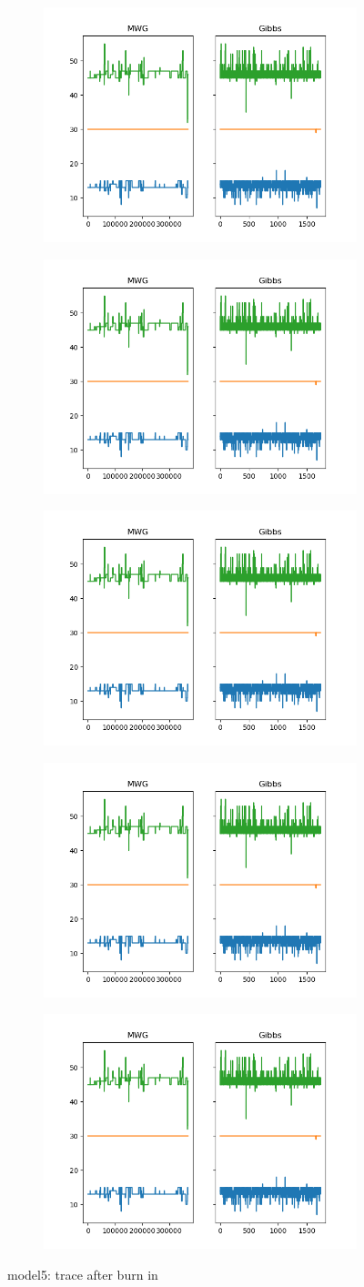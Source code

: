 \begin{figure}[h]
    \centering
    \begin{subfigure}
    	\centering
        \includegraphics[width=0.3\linewidth]{../../plots/Trace_post_burnin_M4_N60_NMCMC3_seed0_diffind2.png}
    \end{subfigure}
    \begin{subfigure}
        \centering
    	\includegraphics[width=0.3\linewidth]{../../plots/Trace_post_burnin_M4_N60_NMCMC3_seed0_diffind2.png}
	\end{subfigure}
	\begin{subfigure}
	    \centering
    	\includegraphics[width=0.3\linewidth]{../../plots/Trace_post_burnin_M4_N60_NMCMC3_seed0_diffind2.png}
	\end{subfigure}
	\begin{subfigure}
	    \centering
    	\includegraphics[width=0.3\linewidth]{../../plots/Trace_post_burnin_M4_N60_NMCMC3_seed0_diffind2.png}
	\end{subfigure}
	\begin{subfigure}
	    \centering
    	\includegraphics[width=0.3\linewidth]{../../plots/Trace_post_burnin_M4_N60_NMCMC3_seed0_diffind2.png}
	\end{subfigure}
	\caption{model5: trace after burn in}
\end{figure}


